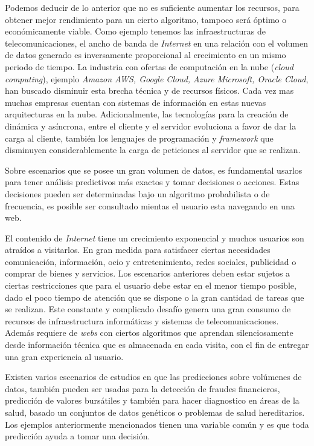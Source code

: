 
Podemos deducir de lo anterior que no es suficiente aumentar los recursos, para obtener  mejor rendimiento para un cierto algoritmo, tampoco será óptimo o económicamente viable. Como ejemplo tenemos las infraestructuras de telecomunicaciones, el ancho de banda de \emph{Internet} en una relación con el volumen de datos generado es inversamente proporcional al crecimiento en un mismo periodo de tiempo. La industria con ofertas de computación en la nube (\emph{cloud computing}), ejemplo \emph{Amazon AWS, Google Cloud, Azure Microsoft, Oracle Cloud}, han buscado disminuir esta brecha técnica y de recursos físicos. Cada vez mas muchas empresas cuentan con sistemas de información en estas nuevas arquitecturas en la nube. Adicionalmente, las tecnologías para la creación de \www dinámica y asíncrona, entre el cliente y el servidor evoluciona a favor de dar la carga al cliente, también los lenguajes de programación y \emph{framework} que disminuyen considerablemente la carga de peticiones al servidor que se realizan.

Sobre escenarios que se posee un gran volumen de datos, es fundamental usarlos para tener análisis predictivos más exactos y tomar decisiones o acciones. Estas decisiones  pueden ser determinadas bajo un algoritmo probabilista o de frecuencia, es posible ser consultado  mientas el usuario esta navegando en una web. 

El contenido de \emph{Internet} tiene un crecimiento exponencial y muchos usuarios son atraídos a visitarlos.  En gran medida para satisfacer ciertas necesidades comunicación, información, ocio y entretenimiento, redes sociales,  publicidad o  comprar de bienes y servicios. Los escenarios anteriores deben estar sujetos a ciertas restricciones que para el usuario debe estar en el menor tiempo posible, dado el poco tiempo de atención que se dispone o la gran cantidad de tareas que se realizan. Este constante y complicado desafío genera una gran consumo de recursos de infraestructura informáticas y sistemas de telecomunicaciones. Además  requiere de \emph{webs} con ciertos algoritmos que aprendan silenciosamente desde información técnica que es almacenada en cada visita, con el fin de entregar una gran experiencia al usuario.
 
Existen varios escenarios de estudios en que las predicciones sobre  volúmenes de datos, también pueden ser usadas para la {detección de fraudes financieros, predicción de valores bursátiles y también para hacer diagnostico en áreas de la salud, basado un conjuntos de datos genéticos o problemas de salud hereditarios. Los ejemplos anteriormente mencionados tienen una variable  común y es que toda predicción ayuda a tomar una decisión.}\label{ejemplos-casos-contextopreliminar}

